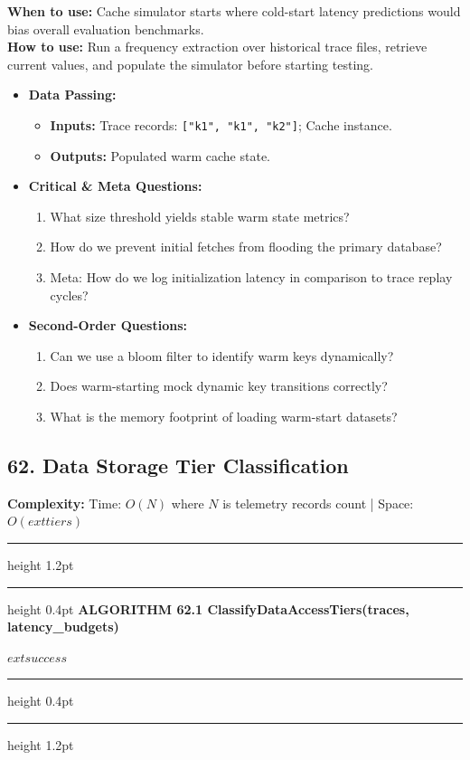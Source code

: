 \documentclass[11pt,a4paper]{article}
\newenvironment{textbookalgo}[2]{%
  \par\addvspace{1.2em}\noindent
  \hrule height 1.2pt
  \vspace{1.5pt}
  \hrule height 0.4pt
  \vspace{5pt}
  {\noindent\large\bfseries\sffamily ALGORITHM #1 \quad #2}
  \par\vspace{5pt}
  \RestyleAlgo{plain}
}{%
  \par\vspace{4pt}
  \hrule height 0.4pt
  \vspace{1.5pt}
  \hrule height 1.2pt
  \par\addvspace{1.2em}
}
\theoremstyle{definition}
\begin{document}
\noindent
\textbf{When to use:} Cache simulator starts where cold-start latency predictions would bias overall evaluation benchmarks.\\
\textbf{How to use:} Run a frequency extraction over historical trace files, retrieve current values, and populate the simulator before starting testing.
\begin{itemize}[leftmargin=*]
  \item[] \textbf{Data Passing:}
    \begin{itemize}
      \item \textbf{Inputs:} Trace records: \texttt{["k1", "k1", "k2"]}; Cache instance.
      \item \textbf{Outputs:} Populated warm cache state.
    \end{itemize}
  \item[] \textbf{Critical \& Meta Questions:}
  \begin{enumerate}
    \item What size threshold yields stable warm state metrics?
    \item How do we prevent initial fetches from flooding the primary database?
    \item Meta: How do we log initialization latency in comparison to trace replay cycles?
  \end{enumerate}
  \item[] \textbf{Second-Order Questions:}
  \begin{enumerate}
    \item Can we use a bloom filter to identify warm keys dynamically?
    \item Does warm-starting mock dynamic key transitions correctly?
    \item What is the memory footprint of loading warm-start datasets?
  \end{enumerate}
\end{itemize}
\medskip

\clearpage
\subsection{62. Data Storage Tier Classification}


\noindent
\textbf{Complexity:} Time: $O(N)$ where $N$ is telemetry records count | Space: $O(	ext{tiers})$
\smallskip

\begin{textbookalgo}{62.1}{ClassifyDataAccessTiers(traces, latency\_budgets)}
\begin{algorithm}[H]
\Return $	ext{success}$\;
\end{algorithm}
\end{textbookalgo}
\end{document}
